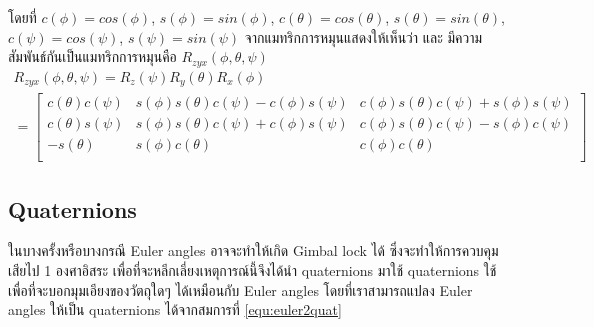 โดยที่ $c(\phi) = cos(\phi)$, $s(\phi) = sin(\phi)$, $c(\theta) = cos(\theta)$, $s(\theta) = sin(\theta)$, $c(\psi) = cos(\psi)$, $s(\psi) = sin(\psi)$
จากแมทริกการหมุนแสดงให้เห็นว่า  และ 
มีความสัมพันธ์กันเป็นแมทริกการหมุนคือ $R_{zyx}(\phi,\theta,\psi)$
\begin{equation}
	\begin{array}{c}
		{R_{zyx}(\phi,\theta,\psi) = R_{z}(\psi)R_{y}(\theta)R_{x}(\phi)}\\
		{= \begin{bmatrix}
		c(\theta)c(\psi) & s(\phi)s(\theta)c(\psi)-c(\phi)s(\psi) & c(\phi)s(\theta)c(\psi)+s(\phi)s(\psi) \\
		c(\theta)s(\psi) & s(\phi)s(\theta)c(\psi)+c(\phi)s(\psi) & c(\phi)s(\theta)c(\psi)-s(\phi)c(\psi) \\
		-s(\theta)       & s(\phi)c(\theta)                       & c(\phi)c(\theta)                       \\
		\end{bmatrix}}
		\label{equ:rotation_matrix_zyx}
	\end{array}
\end{equation}


\subsection*{Quaternions}
ในบางครั้งหรือบางกรณี Euler angles อาจจะทำให้เกิด Gimbal lock ได้
ซึ่งจะทำให้การควบคุมเสียไป 1 องศาอิสระ เพื่อที่จะหลีกเลี่ยงเหตุการณ์นี้จึงได้นำ quaternions มาใช้
quaternions ใช้เพื่อที่จะบอกมุมเอียงของวัตถุใดๆ ได้เหมือนกับ Euler angles
โดยที่เราสามารถแปลง Euler angles ให้เป็น quaternions ได้จากสมการที่ \ref{equ:euler2quat}

